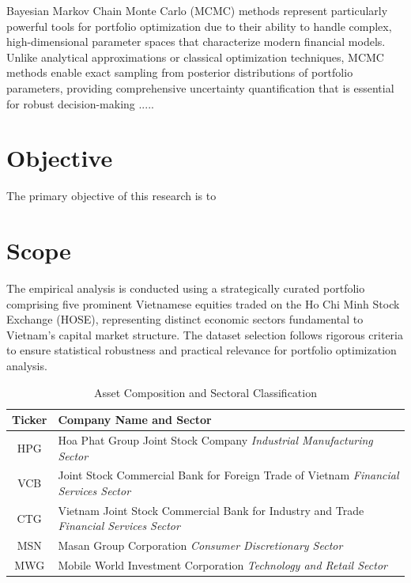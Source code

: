 \documentclass[12pt,a4paper,oneside]{book}
\theoremstyle{definition}
\begin{document}
Bayesian Markov Chain Monte Carlo (MCMC) methods represent particularly powerful tools for portfolio optimization due to their ability to handle complex, high-dimensional parameter spaces that characterize modern financial models. Unlike analytical approximations or classical optimization techniques, MCMC methods enable exact sampling from posterior distributions of portfolio parameters, providing comprehensive uncertainty quantification that is essential for robust decision-making \cite{JohannesPolson2010}.....


\section{Objective}

The primary objective of this research is to 
\section{Scope}

The empirical analysis is conducted using a strategically curated portfolio comprising five prominent Vietnamese equities traded on the Ho Chi Minh Stock Exchange (HOSE), representing distinct economic sectors fundamental to Vietnam's capital market structure. The dataset selection follows rigorous criteria to ensure statistical robustness and practical relevance for portfolio optimization analysis.

\begin{table}[H]
\centering
\caption{Asset Composition and Sectoral Classification}
\begin{tabular}{|c|p{12cm}|}
\hline
\textbf{Ticker} & \textbf{Company Name and Sector} \\
\hline
HPG & Hoa Phat Group Joint Stock Company \newline \textit{Industrial Manufacturing Sector} \\
\hline
VCB & Joint Stock Commercial Bank for Foreign Trade of Vietnam \newline \textit{Financial Services Sector} \\
\hline
CTG & Vietnam Joint Stock Commercial Bank for Industry and Trade \newline \textit{Financial Services Sector} \\
\hline
MSN & Masan Group Corporation \newline \textit{Consumer Discretionary Sector} \\
\hline
MWG & Mobile World Investment Corporation \newline \textit{Technology and Retail Sector} \\
\hline
\end{tabular}
\end{table}
\end{document}
